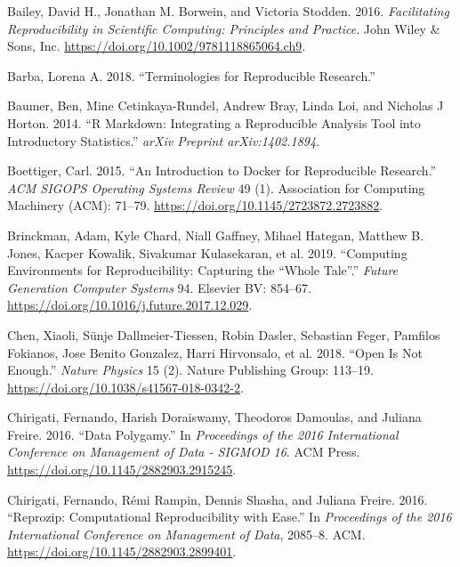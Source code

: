 \documentclass[onecolumn]{article}
\begin{document}
\leavevmode\hypertarget{ref-bailey2016facilitating}{}%
Bailey, David H., Jonathan M. Borwein, and Victoria Stodden. 2016.
\emph{Facilitating Reproducibility in Scientific Computing: Principles
and Practice}. John Wiley \& Sons, Inc.
\url{https://doi.org/10.1002/9781118865064.ch9}.

\leavevmode\hypertarget{ref-barba2018terminologies}{}%
Barba, Lorena A. 2018. ``Terminologies for Reproducible Research.''

\leavevmode\hypertarget{ref-baumer2014r}{}%
Baumer, Ben, Mine Cetinkaya-Rundel, Andrew Bray, Linda Loi, and Nicholas
J Horton. 2014. ``R Markdown: Integrating a Reproducible Analysis Tool
into Introductory Statistics.'' \emph{arXiv Preprint arXiv:1402.1894}.

\leavevmode\hypertarget{ref-Boettiger2015}{}%
Boettiger, Carl. 2015. ``An Introduction to Docker for Reproducible
Research.'' \emph{ACM SIGOPS Operating Systems Review} 49 (1).
Association for Computing Machinery (ACM): 71--79.
\url{https://doi.org/10.1145/2723872.2723882}.

\leavevmode\hypertarget{ref-brinckman2019computing}{}%
Brinckman, Adam, Kyle Chard, Niall Gaffney, Mihael Hategan, Matthew B.
Jones, Kacper Kowalik, Sivakumar Kulasekaran, et al. 2019. ``Computing
Environments for Reproducibility: Capturing the ``Whole Tale''.''
\emph{Future Generation Computer Systems} 94. Elsevier BV: 854--67.
\url{https://doi.org/10.1016/j.future.2017.12.029}.

\leavevmode\hypertarget{ref-chen2019open}{}%
Chen, Xiaoli, Sünje Dallmeier-Tiessen, Robin Dasler, Sebastian Feger,
Pamfilos Fokianos, Jose Benito Gonzalez, Harri Hirvonsalo, et al. 2018.
``Open Is Not Enough.'' \emph{Nature Physics} 15 (2). Nature Publishing
Group: 113--19. \url{https://doi.org/10.1038/s41567-018-0342-2}.

\leavevmode\hypertarget{ref-chirigati2016data}{}%
Chirigati, Fernando, Harish Doraiswamy, Theodoros Damoulas, and Juliana
Freire. 2016. ``Data Polygamy.'' In \emph{Proceedings of the 2016
International Conference on Management of Data - SIGMOD 16}. ACM Press.
\url{https://doi.org/10.1145/2882903.2915245}.

\leavevmode\hypertarget{ref-chirigati2016reprozip}{}%
Chirigati, Fernando, Rémi Rampin, Dennis Shasha, and Juliana Freire.
2016. ``Reprozip: Computational Reproducibility with Ease.'' In
\emph{Proceedings of the 2016 International Conference on Management of
Data}, 2085--8. ACM. \url{https://doi.org/10.1145/2882903.2899401}.
\end{document}

